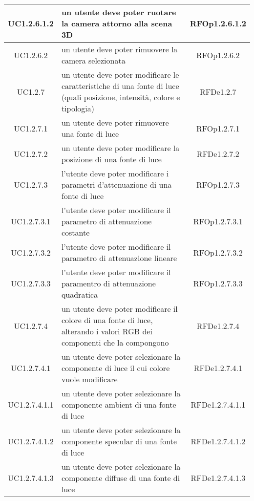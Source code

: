 \begin{longtable}{|c|p{7cm}|c|}
\midrule
UC1.2.6.1.2
& un utente deve poter ruotare la camera attorno alla scena 3D
& RFOp1.2.6.1.2 \\


\midrule
UC1.2.6.2
& un utente deve poter rimuovere la camera selezionata
& RFOp1.2.6.2 \\


\midrule
UC1.2.7
& un utente deve poter modificare le caratteristiche di una fonte di luce (quali posizione, intensità, colore e tipologia)
& RFDe1.2.7 \\


\midrule
UC1.2.7.1
& un utente deve poter rimuovere una fonte di luce
& RFOp1.2.7.1 \\


\midrule
UC1.2.7.2
& un utente deve poter modificare la posizione di una fonte di luce
& RFDe1.2.7.2 \\


\midrule
UC1.2.7.3
& l’utente deve poter modificare i parametri d’attenuazione di una fonte di luce
& RFOp1.2.7.3 \\


\midrule
UC1.2.7.3.1
& l'utente deve poter modificare il parametro di attenuazione costante
& RFOp1.2.7.3.1 \\


\midrule
UC1.2.7.3.2
& l'utente deve poter modificare il parametro di attenuazione lineare
& RFOp1.2.7.3.2 \\


\midrule
UC1.2.7.3.3
& l'utente deve poter modificare il paramentro di attenuazione quadratica
& RFOp1.2.7.3.3 \\


\midrule
UC1.2.7.4
& un utente deve poter modificare il colore di una fonte di luce, alterando i valori RGB dei componenti che la compongono
& RFDe1.2.7.4 \\


\midrule
UC1.2.7.4.1
& un utente deve poter selezionare la componente di luce il cui colore vuole modificare
& RFDe1.2.7.4.1 \\


\midrule
UC1.2.7.4.1.1
& un utente deve poter selezionare la componente ambient di una fonte di luce
& RFDe1.2.7.4.1.1 \\


\midrule
UC1.2.7.4.1.2
& un utente deve poter selezionare la componente specular di una fonte di luce
& RFDe1.2.7.4.1.2 \\


\midrule
UC1.2.7.4.1.3
& un utente deve poter selezionare la componente diffuse di una fonte di luce
& RFDe1.2.7.4.1.3 \\



\end{longtable}
